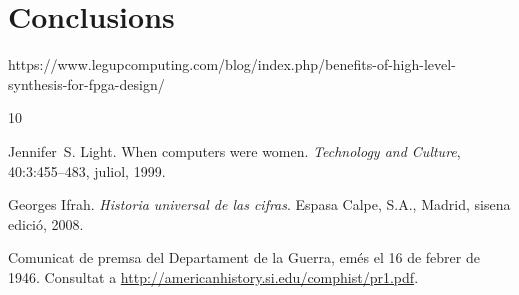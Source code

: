 \documentclass[11pt,spanish,listoffigures,listoftables]{tfgetsinf}
\begin{document}

\chapter{Conclusions}
https://www.legupcomputing.com/blog/index.php/benefits-of-high-level-synthesis-for-fpga-design/


\begin{thebibliography}{10}

   Jennifer~S. Light.
   \newblock When computers were women.
   \newblock \textit{Technology and Culture}, 40:3:455--483, juliol, 1999.

   Georges Ifrah.
   \newblock \textit{Historia universal de las cifras}.
   \newblock Espasa Calpe, S.A., Madrid, sisena edició, 2008.

   Comunicat de premsa del Departament de la Guerra, 
   emés el 16 de febrer de 1946. 
   \newblock Consultat a 
   \url{http://americanhistory.si.edu/comphist/pr1.pdf}.

\end{thebibliography}
\cleardoublepage

\end{document}

